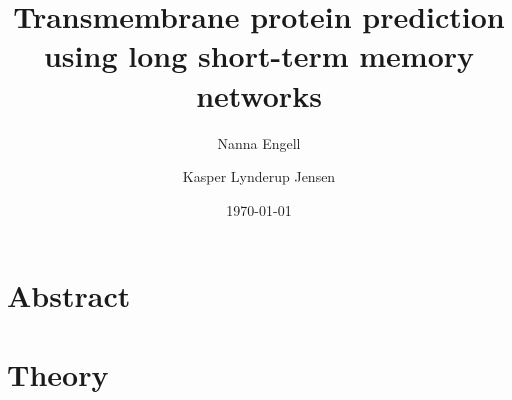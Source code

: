 \documentclass{article}
\title{Transmembrane protein prediction using long short-term memory networks}
\author{Nanna Engell \and
		Kasper Lynderup Jensen}
\date{\today}
\begin{document}
\maketitle

\section*{Abstract}

\tableofcontents




\section{Theory} 





\end{document}

